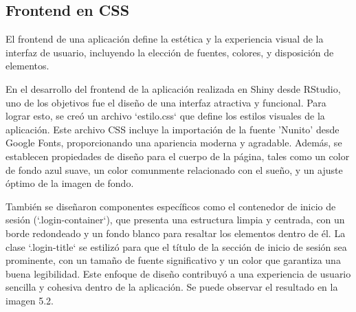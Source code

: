 \documentclass[a4paper,12pt,twoside]{memoir}
\begin{document}
\subsection{Frontend en CSS}
El frontend de una aplicación define la estética y la experiencia visual de la interfaz de usuario, incluyendo la elección de fuentes, colores, y disposición de elementos.

En el desarrollo del frontend de la aplicación realizada en Shiny desde RStudio, uno de los objetivos fue el diseño de una interfaz atractiva y funcional. Para lograr esto, se creó un archivo `estilo.css` que define los estilos visuales de la aplicación. Este archivo CSS incluye la importación de la fuente 'Nunito' desde Google Fonts, proporcionando una apariencia moderna y agradable. Además, se establecen propiedades de diseño para el cuerpo de la página, tales como un color de fondo azul suave, un color comunmente relacionado con el sueño, y un ajuste óptimo de la imagen de fondo. 

También se diseñaron componentes específicos como el contenedor de inicio de sesión (`.login-container`), que presenta una estructura limpia y centrada, con un borde redondeado y un fondo blanco para resaltar los elementos dentro de él. La clase `.login-title` se estilizó para que el título de la sección de inicio de sesión sea prominente, con un tamaño de fuente significativo y un color que garantiza una buena legibilidad. Este enfoque de diseño contribuyó a una experiencia de usuario sencilla y cohesiva dentro de la aplicación. Se puede observar el resultado en la imagen 5.2.
\end{document}
